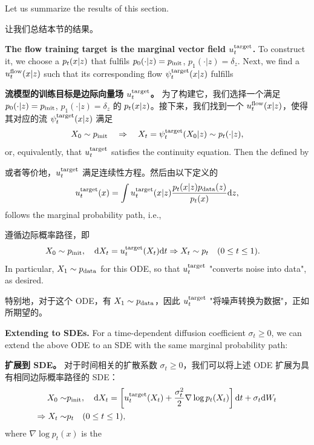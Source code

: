 Let us summarize the results of this section.

让我们总结本节的结果。
\begin{summarybox}
\textbf{The flow training target is the marginal vector field $u^{\text{target}}_t$.} To construct it, we choose a  $p_t(x|z)$ that fulfils $p_0(\cdot|z)=p_{\rm{init}}$, $p_1(\cdot|z)=\delta_{z}$. Next, we find a  $u^{\text{flow}}_t(x|z)$ such that its corresponding flow $\psi^{\text{target}}_t(x|z)$ fulfills

\textbf{流模型的训练目标是边际向量场 $u^{\text{target}}_t$。} 为了构建它，我们选择一个满足 $p_0(\cdot|z)=p_{\rm{init}}$, $p_1(\cdot|z)=\delta_{z}$ 的  $p_t(x|z)$。接下来，我们找到一个  $u^{\text{flow}}_t(x|z)$，使得其对应的流 $\psi^{\text{target}}_t(x|z)$ 满足
\begin{align*}
    X_0\sim p_{\rm{init}} \quad \Rightarrow \quad X_t = \psi^{\text{target}}_t(X_0|z) \sim p_t(\cdot|z),
\end{align*}
or, equivalently, that $u^{\text{target}}_t$ satisfies the continuity equation.  Then the  defined by

或者等价地，$u^{\text{target}}_t$ 满足连续性方程。然后由以下定义的 
\begin{align}
    \label{eq:marginal_vector_field_restated}
    u^{\text{target}}_t(x) = \int u^{\text{target}}_t(x|z)\frac{p_t(x|z)p_{\rm{data}}(z)}{p_t(x)}\mathrm{d} z,
\end{align}
follows the marginal probability path, i.e.,

遵循边际概率路径，即
\begin{align}
    \label{eq:marginal_ode_follows_marginal_path_restated}
    X_0&\sim p_{\rm{init}},\quad \mathrm{d} X_t =u^{\text{target}}_t(X_t)\mathrm{d} t\Rightarrow X_t\sim p_t\quad (0\leq t\leq 1).
\end{align}
In particular, $X_1\sim p_{\rm{data}}$ for this ODE, so that $u^{\text{target}}_t$ "converts noise into data", as desired.

特别地，对于这个 ODE，有 $X_1\sim p_{\rm{data}}$，因此 $u^{\text{target}}_t$ "将噪声转换为数据"，正如所期望的。


\textbf{Extending to SDEs.} For a time-dependent diffusion coefficient $\sigma_t\geq 0$, we can extend the above ODE to an SDE with the same marginal probability path:

\textbf{扩展到 SDE。} 对于时间相关的扩散系数 $\sigma_t\geq 0$，我们可以将上述 ODE 扩展为具有相同边际概率路径的 SDE：
\begin{align}
\label{eq:sde_extension_restated}
    X_0\sim&p_{\rm{init}},\quad \mathrm{d} X_t =\left[u^{\text{target}}_t(X_t)+\frac{\sigma_t^2}{2}\nabla\log p_t(X_t)\right]\mathrm{d} t +\sigma_t\mathrm{d} W_t\\
    \label{eq:marginal_ode_follows_marginal_path_restated}
    \Rightarrow X_t\sim& p_t\quad (0\leq t\leq 1),
\end{align}
where $\nabla\log p_t(x)$ is the 


\end{summarybox}
